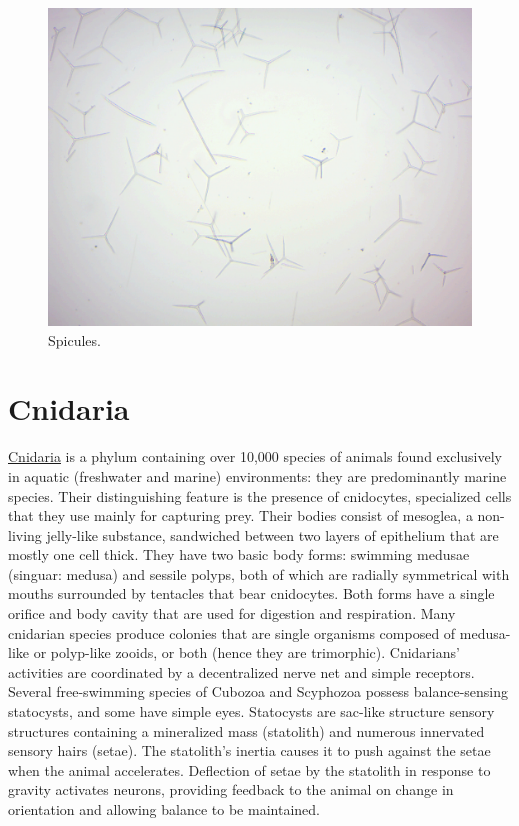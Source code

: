 \begin{figure}

{\centering \includegraphics[width=0.7\linewidth]{./figures/porifera/spicules}

}

\caption{Spicules.}\label{fig:spicules}
\end{figure}

\section{Cnidaria}\label{cnidaria}

\href{https://en.wikipedia.org/wiki/Cnidaria}{Cnidaria} is a phylum
containing over 10,000 species of animals found exclusively in aquatic
(freshwater and marine) environments: they are predominantly marine
species. Their distinguishing feature is the presence of cnidocytes,
specialized cells that they use mainly for capturing prey. Their bodies
consist of mesoglea, a non-living jelly-like substance, sandwiched
between two layers of epithelium that are mostly one cell thick. They
have two basic body forms: swimming medusae (singuar: medusa) and
sessile polyps, both of which are radially symmetrical with mouths
surrounded by tentacles that bear cnidocytes. Both forms have a single
orifice and body cavity that are used for digestion and respiration.
Many cnidarian species produce colonies that are single organisms
composed of medusa-like or polyp-like zooids, or both (hence they are
trimorphic). Cnidarians' activities are coordinated by a decentralized
nerve net and simple receptors. Several free-swimming species of Cubozoa
and Scyphozoa possess balance-sensing statocysts, and some have simple
eyes. Statocysts are sac-like structure sensory structures containing a
mineralized mass (statolith) and numerous innervated sensory hairs
(setae). The statolith's inertia causes it to push against the setae
when the animal accelerates. Deflection of setae by the statolith in
response to gravity activates neurons, providing feedback to the animal
on change in orientation and allowing balance to be maintained.

